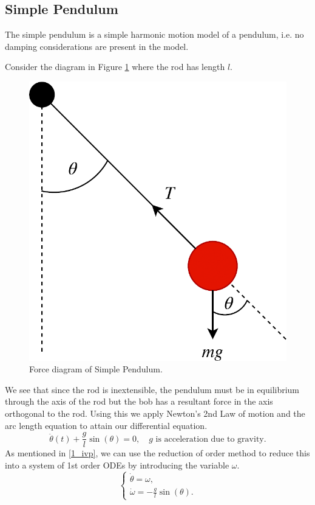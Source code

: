 \documentclass[12pt, twoside]{report}
\theoremstyle{plain}
\theoremstyle{definition}
\theoremstyle{definition}
\begin{document}
        \subsection{Simple Pendulum}
        \label{5_simple_pendulum}
            The simple pendulum is a simple harmonic motion model of a
            pendulum, i.e. no damping considerations are present in the model.

            Consider the diagram in Figure \ref{5_simple_diag} where the rod
            has length $l$. 
            \begin{figure}[H]
                \centering
                    \includegraphics[width=0.25\columnwidth]{simple_pendulum}
                    \caption[caption]{Force diagram of Simple Pendulum.}
                    \label{5_simple_diag}
            \end{figure} 

            We see that since the rod is inextensible, the pendulum must be
            in equilibrium through the axis of the rod but the bob has a 
            resultant force in the axis orthogonal to the rod. Using this we
            apply Newton's 2nd Law of motion and the arc length equation to
            attain our differential equation. 
            \begin{equation}
            \label{eq:shm}
                \ddot{\theta}(t) + \frac{g}{l}\sin(\theta) = 0, \quad g \text{ is 
                acceleration due to gravity.}
            \end{equation}
            As mentioned in \ref{1_ivp}, we can use the reduction of order
            method to reduce this into a system of 1st order ODEs by 
            introducing the variable $\omega$.
            \begin{equation}
            \label{eq:shm_system}
                \begin{cases}
                    \dot{\theta} = \omega, \\
                    \dot{\omega} = -\frac{g}{l}\sin(\theta).
                \end{cases}
            \end{equation}
\end{document}
